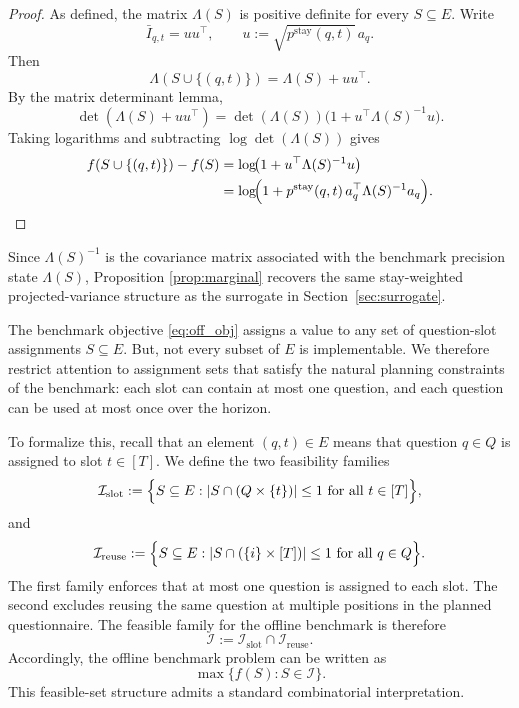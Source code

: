 \documentclass{article}
\begin{document}
\begin{proof}
As defined, the matrix $\Lambda(S)$
is positive definite for every $S\subseteq E$. Write
\[
\bar I_{q,t} = u u^\top,
\qquad
u := \sqrt{p^{\text{stay}}(q,t)}\, a_q.
\]
Then
\[
\Lambda(S\cup\{(q,t)\}) = \Lambda(S) + u u^\top.
\]
By the matrix determinant lemma,
\[
\det(\Lambda(S)+u u^\top)
=
\det(\Lambda(S))\bigl(1+u^\top \Lambda(S)^{-1}u\bigr).
\]
Taking logarithms and subtracting $\log\det(\Lambda(S))$ gives
\begin{align*}
   f(S\cup\{(q,t)\}) - f(S)
&= 
\log\!\bigl(1+u^\top \Lambda(S)^{-1}u\bigr)\\
&= 
\log\!\Bigl(1 + p^{\text{stay}}(q,t)\, a_q^\top \Lambda(S)^{-1} a_q\Bigr). 
\end{align*}
\end{proof}

Since $\Lambda(S)^{-1}$
is the covariance matrix associated with the benchmark precision state 
$\Lambda(S)$, Proposition \ref{prop:marginal} recovers the same stay-weighted projected-variance structure as the surrogate in Section~\ref{sec:surrogate}.


The benchmark objective \eqref{eq:off_obj} assigns a value to any set of question-slot
assignments $S \subseteq E$. But, not every
subset of $E$ is implementable. We therefore restrict attention to assignment sets that
satisfy the natural planning constraints of the benchmark: each slot can contain at most
one question, and each question can be used at most once over the horizon.

To formalize this, recall that an element $(q,t) \in E$ means that question $q \in Q$
is assigned to slot $t \in [T]$. We define the two feasibility families
\begin{equation}
\mathcal I_{\text{slot}}
:=
\Bigl\{
S \subseteq E :
|S \cap (Q \times \{t\})| \le 1
\text{ for all } t \in [T]
\Bigr\},
\end{equation}
and
\begin{equation}
\mathcal I_{\text{reuse}}
:=
\Bigl\{
S \subseteq E :
|S \cap (\{i\} \times [T])| \le 1
\text{ for all } q \in Q
\Bigr\}.
\end{equation}
The first family enforces that at most one question is assigned to each slot. The
second excludes reusing the same question at multiple positions in the planned questionnaire.
The feasible family for the offline benchmark is therefore
\[
\mathcal I := \mathcal I_{\text{slot}} \cap \mathcal I_{\text{reuse}}.
\]
Accordingly, the offline benchmark problem can be written as
\begin{equation}\label{eq:offline_bench}
\max \{ f(S) : S \in \mathcal I \}.
\end{equation}
This feasible-set structure admits a standard combinatorial interpretation.
\end{document}
